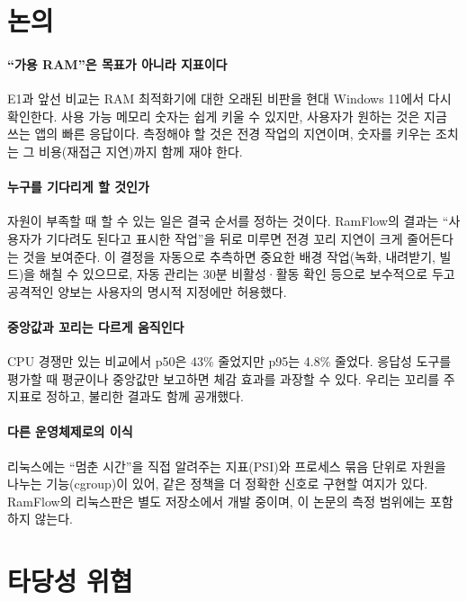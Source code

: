 \documentclass[11pt]{article}
\begin{document}
\section{논의}
\label{sec:discussion}

\paragraph{``가용 RAM''은 목표가 아니라 지표이다}
E1과 앞선 비교는 RAM 최적화기에 대한 오래된 비판\citep{russinovich2004}을 현대 Windows 11에서 다시 확인한다. 사용 가능 메모리 숫자는 쉽게 키울 수 있지만, 사용자가 원하는 것은 지금 쓰는 앱의 빠른 응답이다. 측정해야 할 것은 전경 작업의 지연이며, 숫자를 키우는 조치는 그 비용(재접근 지연)까지 함께 재야 한다.

\paragraph{누구를 기다리게 할 것인가}
자원이 부족할 때 할 수 있는 일은 결국 순서를 정하는 것이다. RamFlow의 결과는 ``사용자가 기다려도 된다고 표시한 작업''을 뒤로 미루면 전경 꼬리 지연이 크게 줄어든다는 것을 보여준다. 이 결정을 자동으로 추측하면 중요한 배경 작업(녹화, 내려받기, 빌드)을 해칠 수 있으므로, 자동 관리는 30분 비활성·활동 확인 등으로 보수적으로 두고 공격적인 양보는 사용자의 명시적 지정에만 허용했다.

\paragraph{중앙값과 꼬리는 다르게 움직인다}
CPU 경쟁만 있는 비교에서 p50은 43\% 줄었지만 p95는 4.8\% 줄었다. 응답성 도구를 평가할 때 평균이나 중앙값만 보고하면 체감 효과를 과장할 수 있다. 우리는 꼬리를 주 지표로 정하고, 불리한 결과도 함께 공개했다.

\paragraph{다른 운영체제로의 이식}
리눅스에는 ``멈춘 시간''을 직접 알려주는 지표(PSI)와 프로세스 묶음 단위로 자원을 나누는 기능(cgroup)이 있어, 같은 정책을 더 정확한 신호로 구현할 여지가 있다. RamFlow의 리눅스판은 별도 저장소에서 개발 중이며, 이 논문의 측정 범위에는 포함하지 않는다.

\section{타당성 위협}
\label{sec:threats}
\end{document}
